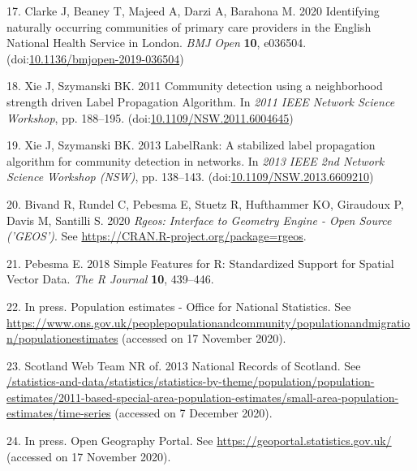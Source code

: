 \documentclass[
]{article}
\begin{document}
\leavevmode\hypertarget{ref-clarkeIdentifyingNaturallyOccurring2020}{}%
17. Clarke J, Beaney T, Majeed A, Darzi A, Barahona M. 2020 Identifying
naturally occurring communities of primary care providers in the English
National Health Service in London. \emph{BMJ Open} \textbf{10}, e036504.
(doi:\href{https://doi.org/10.1136/bmjopen-2019-036504}{10.1136/bmjopen-2019-036504})

\leavevmode\hypertarget{ref-xieCommunityDetectionUsing2011}{}%
18. Xie J, Szymanski BK. 2011 Community detection using a neighborhood
strength driven Label Propagation Algorithm. In \emph{2011 IEEE Network
Science Workshop}, pp. 188--195.
(doi:\href{https://doi.org/10.1109/NSW.2011.6004645}{10.1109/NSW.2011.6004645})

\leavevmode\hypertarget{ref-xieLabelRankStabilizedLabel2013}{}%
19. Xie J, Szymanski BK. 2013 LabelRank: A stabilized label propagation
algorithm for community detection in networks. In \emph{2013 IEEE 2nd
Network Science Workshop (NSW)}, pp. 138--143.
(doi:\href{https://doi.org/10.1109/NSW.2013.6609210}{10.1109/NSW.2013.6609210})

\leavevmode\hypertarget{ref-bivandRgeosInterfaceGeometry2020}{}%
20. Bivand R, Rundel C, Pebesma E, Stuetz R, Hufthammer KO, Giraudoux P,
Davis M, Santilli S. 2020 \emph{Rgeos: Interface to Geometry Engine -
Open Source ('GEOS')}. See
\url{https://CRAN.R-project.org/package=rgeos}.

\leavevmode\hypertarget{ref-pebesmaSimpleFeaturesStandardized2018}{}%
21. Pebesma E. 2018 Simple Features for R: Standardized Support for
Spatial Vector Data. \emph{The R Journal} \textbf{10}, 439--446.

\leavevmode\hypertarget{ref-PopulationEstimatesOffice}{}%
22. In press. Population estimates - Office for National Statistics. See
\url{https://www.ons.gov.uk/peoplepopulationandcommunity/populationandmigration/populationestimates}
(accessed on 17 November 2020).

\leavevmode\hypertarget{ref-teamNationalRecordsScotland2013}{}%
23. Scotland Web Team NR of. 2013 National Records of Scotland. See
\url{/statistics-and-data/statistics/statistics-by-theme/population/population-estimates/2011-based-special-area-population-estimates/small-area-population-estimates/time-series}
(accessed on 7 December 2020).

\leavevmode\hypertarget{ref-OpenGeographyPortal}{}%
24. In press. Open Geography Portal. See
\url{https://geoportal.statistics.gov.uk/} (accessed on 17 November
2020).
\end{document}
